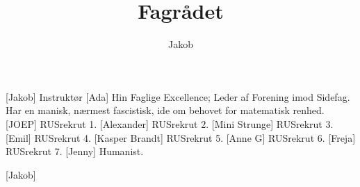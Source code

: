 \documentclass[a4paper,11pt]{article}
\title{Fagrådet}
\author{Jakob}
\begin{document}
\maketitle

\begin{roles}
[Jakob] Instruktør
[Ada] Hin Faglige Excellence; Leder af Forening imod Sidefag. Har en manisk, nærmest fascistisk, ide om behovet for matematisk renhed. 
[JOEP] RUSrekrut 1.
[Alexander] RUSrekrut 2.
[Mini Strunge] RUSrekrut 3.
[Emil] RUSrekrut 4.
[Kasper Brandt] RUSrekrut 5.
[Anne G] RUSrekrut 6.
[Freja] RUSrekrut 7.
[Jenny] Humanist.
\end{roles}

\begin{props}
[Jakob]
\end{props}
\end{document}
